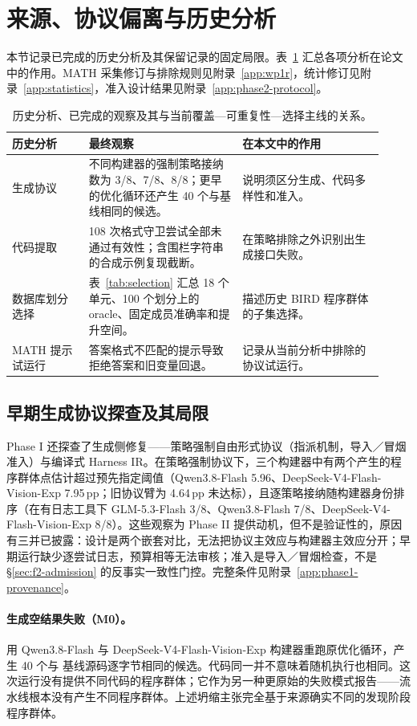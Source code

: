 \section{来源、协议偏离与历史分析}\label{app:history}
本节记录已完成的历史分析及其保留记录的固定局限。表~\ref{tab:history-map} 汇总各项分析在论文中的作用。MATH 采集修订与排除规则见附录~\ref{app:wp1r}，统计修订见附录~\ref{app:statistics}，准入设计结果见附录~\ref{app:phase2-protocol}。

\begin{table}[H]
\centering\small
\begin{tabular}{@{}p{0.19\linewidth}p{0.38\linewidth}p{0.35\linewidth}@{}}
\toprule
历史分析 & 最终观察 & 在本文中的作用 \\
\midrule
生成协议 & 不同构建器的强制策略接纳数为 3/8、7/8、8/8；更早的优化循环还产生 40 个与基线相同的候选。 & 说明须区分生成、代码多样性和准入。 \\
代码提取 & 108 次格式守卫尝试全部未通过有效性；含围栏字符串的合成示例复现截断。 & 在策略排除之外识别出生成接口失败。 \\
数据库划分选择 & 表~\ref{tab:selection} 汇总 18 个单元、100 个划分上的 oracle、固定成员准确率和提升空间。 & 描述历史 BIRD 程序群体的子集选择。 \\
MATH 提示试运行 & 答案格式不匹配的提示导致拒绝答案和旧变量回退。 & 记录从当前分析中排除的协议试运行。 \\
\bottomrule
\end{tabular}
\caption{历史分析、已完成的观察及其与当前覆盖—可重复性—选择主线的关系。}
\label{tab:history-map}
\end{table}
\subsection{早期生成协议探查及其局限}\label{sec:phase1probes}
Phase I 还探查了生成侧修复——策略强制自由形式协议（指派机制，导入／冒烟准入）与编译式 Harness IR。在策略强制协议下，三个构建器中有两个产生的程序群体点估计超过预先指定阈值（Qwen3.8-Flash 5.96、DeepSeek-V4-Flash-Vision-Exp 7.95\,pp；旧协议臂为 4.64\,pp 未达标），且逐策略接纳随构建器身份排序（在有日志工具下 GLM-5.3-Flash 3/8、Qwen3.8-Flash 7/8、DeepSeek-V4-Flash-Vision-Exp 8/8）。这些观察为 Phase II 提供动机，但不是验证性的，原因有三并已披露：设计是两个嵌套对比，无法把协议主效应与构建器主效应分开；早期运行缺少逐尝试日志，预算相等无法审核；准入是导入／冒烟检查，不是 \S\ref{sec:f2-admission} 的反事实一致性门控。完整条件见附录~\ref{app:phase1-provenance}。

\paragraph{生成空结果失败（M0）。}用 Qwen3.8-Flash 与 DeepSeek-V4-Flash-Vision-Exp 构建器重跑原优化循环，产生 40 个与 \bare{} 基线源码逐字节相同的候选。代码同一并不意味着随机执行也相同。这次运行没有提供不同代码的程序群体；它作为另一种更原始的失败模式报告——流水线根本没有产生不同程序群体。上述坍缩主张完全基于来源确实不同的发现阶段程序群体。

